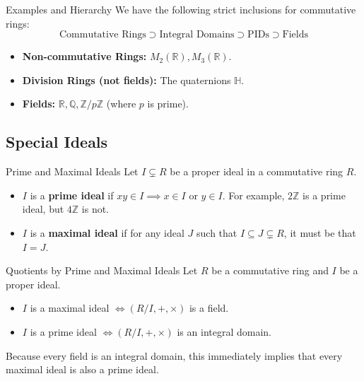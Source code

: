 \documentclass[11pt, a4paper]{article}
\newcommand{\R}{\mathbb{R}}
\newcommand{\Z}{\mathbb{Z}}
\newcommand{\Q}{\mathbb{Q}}
\begin{document}
\begin{remark}{Examples and Hierarchy}{}
We have the following strict inclusions for commutative rings:
$$ \text{Commutative Rings} \supset \text{Integral Domains} \supset \text{PIDs} \supset \text{Fields} $$ %
\begin{itemize}
    \item \textbf{Non-commutative Rings:} $M_2(\R), M_3(\R)$. %
    \item \textbf{Division Rings (not fields):} The quaternions $\mathbb{H}$. %
    \item \textbf{Fields:} $\R, \Q, \Z/p\Z$ (where $p$ is prime). %
\end{itemize}
\end{remark}

\subsection{Special Ideals}

\begin{definition}{Prime and Maximal Ideals}{}
Let $I \subsetneq R$ be a proper ideal in a commutative ring $R$.
\begin{itemize}
    \item $I$ is a \textbf{prime ideal} if $xy \in I \implies x \in I \text{ or } y \in I$. %
    For example, $2\Z$ is a prime ideal, but $4\Z$ is not. %
    \item $I$ is a \textbf{maximal ideal} if for any ideal $J$ such that $I \subseteq J \subsetneq R$, it must be that $I = J$. %
\end{itemize}
\end{definition}

\begin{theorem}{Quotients by Prime and Maximal Ideals}{}
Let $R$ be a commutative ring and $I$ be a proper ideal. %
\begin{itemize}
    \item $I$ is a maximal ideal $\iff (R/I, +, \times)$ is a field. %
    \item $I$ is a prime ideal $\iff (R/I, +, \times)$ is an integral domain. %
\end{itemize}
Because every field is an integral domain, this immediately implies that every maximal ideal is also a prime ideal. %
\end{theorem}

\end{document}
